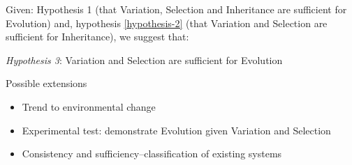 Given:\newline
Hypothesis 1 (that Variation, Selection and Inheritance are sufficient for Evolution) and,\newline
hypothesis \autoref{hypothesis-2} (that Variation and Selection are sufficient for Inheritance),\newline
we suggest that:

\textit{Hypothesis 3}: Variation and Selection are sufficient for Evolution

Possible extensions

\begin{itemize}
	\item
 Trend to environmental change
	\item
 Experimental test: demonstrate Evolution given Variation and Selection
	\item
 Consistency and sufficiency--classification of existing systems
\end{itemize}
